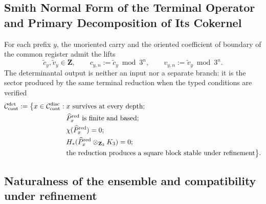 \subsection{Smith Normal Form of the Terminal Operator and Primary Decomposition of Its Cokernel}
For each prefix \(y\), the unoriented carry and the oriented coefficient
of boundary of the common register admit the lifts
\begin{equation}
\label{eq:detint-c-v-lifts}
 \widetilde c_y,\widetilde v_y\in\mathbf Z,\qquad
 c_{y,n}:=\widetilde c_y\bmod3^n,\qquad
 v_{y,n}:=\widetilde v_y\bmod3^n.
\end{equation}
The determinantal output is neither an input nor a separate branch: it is the sector
produced by the same terminal reduction when the typed conditions
are verified
\begin{equation}
\label{eq:detint-dominio}
\begin{split}
 \mathcal C_{\rm cont}^{\rm det}:=\bigl\{x\in\mathcal C_{\rm cont}^{\rm disc}:{}&
 x\text{ survives at every depth};\\
 &\widehat P_x^{\rm red}\text{ is finite and based};\\
 &\chi(\widehat P_x^{\rm red})=0;\\
 &H_*(\widehat P_x^{\rm red}\otimes_{\mathbf Z_3}K_3)=0;\\
 &\text{the reduction produces a square block stable under refinement}
 \bigr\}.
\end{split}
\end{equation}
\begingroup
  \let\section\subsection
  
\endgroup

\section{Naturalness of the ensemble and compatibility under refinement}

